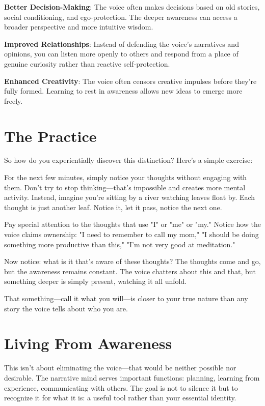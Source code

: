 \documentclass[10pt,twocolumn]{article}
\begin{document}
\textbf{Better Decision-Making}: The voice often makes decisions based on old stories, social conditioning, and ego-protection. The deeper awareness can access a broader perspective and more intuitive wisdom.

\textbf{Improved Relationships}: Instead of defending the voice's narratives and opinions, you can listen more openly to others and respond from a place of genuine curiosity rather than reactive self-protection.

\textbf{Enhanced Creativity}: The voice often censors creative impulses before they're fully formed. Learning to rest in awareness allows new ideas to emerge more freely.

\section{The Practice}

So how do you experientially discover this distinction? Here's a simple exercise:

For the next few minutes, simply notice your thoughts without engaging with them. Don't try to stop thinking—that's impossible and creates more mental activity. Instead, imagine you're sitting by a river watching leaves float by. Each thought is just another leaf. Notice it, let it pass, notice the next one.

Pay special attention to the thoughts that use "I" or "me" or "my." Notice how the voice claims ownership: "I need to remember to call my mom," "I should be doing something more productive than this," "I'm not very good at meditation."

Now notice: what is it that's aware of these thoughts? The thoughts come and go, but the awareness remains constant. The voice chatters about this and that, but something deeper is simply present, watching it all unfold.

That something—call it what you will—is closer to your true nature than any story the voice tells about who you are.

\section{Living From Awareness}

This isn't about eliminating the voice—that would be neither possible nor desirable. The narrative mind serves important functions: planning, learning from experience, communicating with others. The goal is not to silence it but to recognize it for what it is: a useful tool rather than your essential identity.
\end{document}
